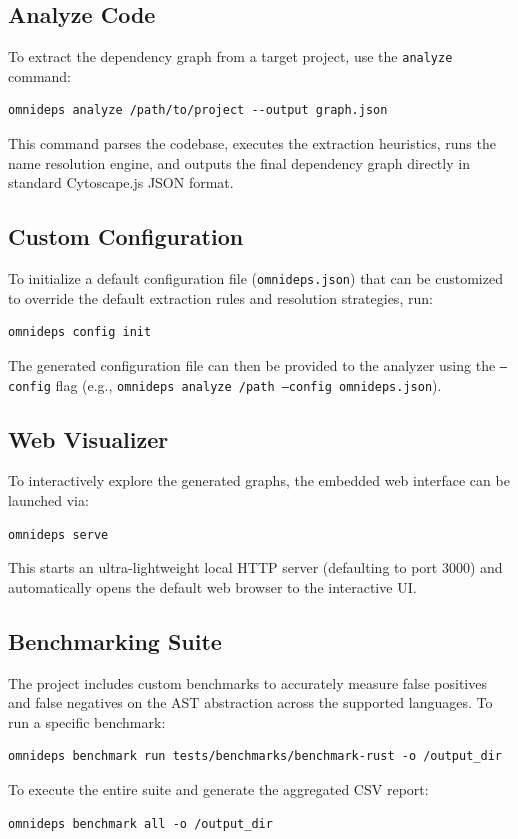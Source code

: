 \subsection*{Analyze Code}
To extract the dependency graph from a target project, use the
\texttt{analyze} command:
\begin{verbatim}
omnideps analyze /path/to/project --output graph.json
\end{verbatim}
This command parses the codebase, executes the extraction heuristics, runs
the name resolution engine, and outputs the final dependency graph directly
in standard Cytoscape.js JSON format.

\subsection*{Custom Configuration}
To initialize a default configuration file (\texttt{omnideps.json})
that can be customized to override the default extraction rules and
resolution strategies, run:
\begin{verbatim}
omnideps config init
\end{verbatim}
The generated configuration file can then be provided to the analyzer
using the \texttt{--config} flag (e.g., \texttt{omnideps analyze
/path --config omnideps.json}).

\subsection*{Web Visualizer}
To interactively explore the generated graphs, the embedded web
interface can be launched via:
\begin{verbatim}
omnideps serve
\end{verbatim}
This starts an ultra-lightweight local HTTP server (defaulting to
port 3000) and automatically opens the default web browser to the
interactive UI.

\subsection*{Benchmarking Suite}
The project includes custom benchmarks to accurately measure false
positives and false negatives on the AST abstraction across the
supported languages.
To run a specific benchmark:
{\small
\begin{verbatim}
omnideps benchmark run tests/benchmarks/benchmark-rust -o /output_dir
\end{verbatim}
}
To execute the entire suite and generate the aggregated CSV report:
\begin{verbatim}
omnideps benchmark all -o /output_dir
\end{verbatim}

